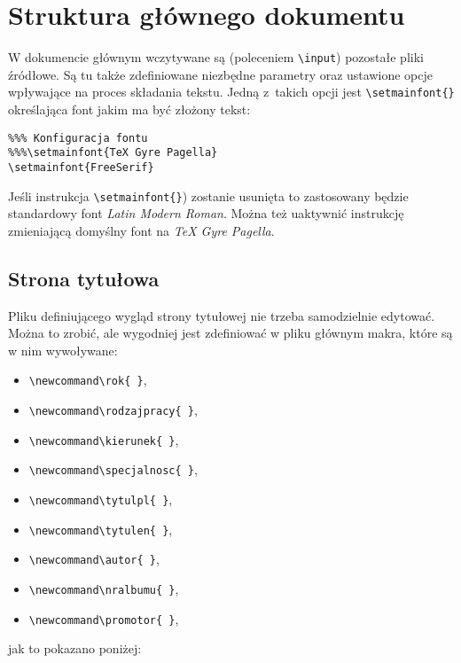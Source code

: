 \section{Struktura głównego dokumentu}
W dokumencie głównym wczytywane są (poleceniem \texttt{\textbackslash input}) pozostałe pliki źródłowe. Są tu także zdefiniowane niezbędne parametry oraz ustawione opcje wpływające na proces składania tekstu. Jedną z~takich opcji jest \texttt{\textbackslash setmainfont\{\}} określająca font jakim ma być złożony tekst:  

{\footnotesize \begin{verbatim}
%%% Konfiguracja fontu
%%%\setmainfont{TeX Gyre Pagella}
\setmainfont{FreeSerif}
\end{verbatim}
}

Jeśli instrukcja \texttt{\textbackslash setmainfont\{\}}) zostanie usunięta to zastosowany będzie standardowy font \textit{Latin Modern Roman}. Można też uaktywnić instrukcję zmieniającą domyślny font na \textit{TeX Gyre Pagella}.

\subsection{Strona tytułowa}
Pliku definiującego wygląd strony tytułowej nie trzeba samodzielnie edytować. Można to zrobić, ale wygodniej jest zdefiniować w pliku głównym makra, które są w nim wywoływane:
\begin{itemize}
\item  \texttt{\textbackslash newcommand\textbackslash rok\{\  \}},
\item  \texttt{\textbackslash newcommand\textbackslash rodzajpracy\{\  \}},
\item  \texttt{\textbackslash newcommand\textbackslash kierunek\{\  \}},
\item  \texttt{\textbackslash newcommand\textbackslash specjalnosc\{\  \}},
\item  \texttt{\textbackslash newcommand\textbackslash tytulpl\{\  \}},
\item  \texttt{\textbackslash newcommand\textbackslash tytulen\{\  \}},
\item  \texttt{\textbackslash newcommand\textbackslash autor\{\  \}},
\item  \texttt{\textbackslash newcommand\textbackslash nralbumu\{\  \}},
\item  \texttt{\textbackslash newcommand\textbackslash promotor\{\  \}},
\end{itemize}
jak to pokazano poniżej:

